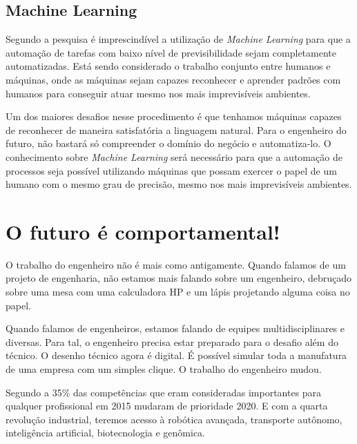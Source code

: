 \documentclass[
	12pt,				%
	openright,			%
	oneside,			%
	a4paper,			%
    tikz,
	english,			%
	french,				%
	spanish,			%
	brazil				%
	]{abntex2}
\begin{document}
\section{Machine Learning}

Segundo a pesquisa é imprescindível a utilização de
\textit{Machine Learning} para que a automação de tarefas
com baixo nível de previsibilidade sejam completamente
automatizadas. Está sendo considerado o trabalho conjunto entre
humanos e máquinas, onde as máquinas sejam capazes reconhecer
e aprender padrões com humanos para conseguir atuar mesmo
nos mais imprevisíveis ambientes.

\par
Um dos maiores desafios nesse procedimento é que tenhamos máquinas
capazes de reconhecer de maneira satisfatória a linguagem
natural. Para o engenheiro do futuro, não bastará só compreender
o domínio do negócio e automatiza-lo. O conhecimento sobre
\textit{Machine Learning} será necessário para que a automação
de processos seja possível utilizando máquinas que possam exercer o
papel de um humano com o mesmo grau de precisão, mesmo nos mais
imprevisíveis ambientes.

\chapter{O futuro é comportamental!}

O trabalho do engenheiro não é mais como antigamente. Quando
falamos de um projeto de engenharia, não estamos mais falando
sobre um engenheiro, debruçado sobre uma mesa com uma calculadora
HP e um lápis projetando alguma coisa no papel.

\par

Quando falamos de engenheiros, estamos falando de equipes
multidisciplinares e diversas. Para tal, o engenheiro precisa
estar preparado para o desafio além do técnico. O desenho
técnico agora é digital. É possível simular toda a manufatura
de uma empresa com um simples clique. O trabalho do engenheiro
mudou.

Segundo a \hbox{\cite{WeForum}} 35\% das competências que eram
consideradas importantes para qualquer profissional em 2015
mudaram de prioridade 2020. E com a quarta revolução industrial,
teremos acesso à robótica avançada, transporte autônomo,
inteligência artificial, biotecnologia e genômica.
\end{document}
